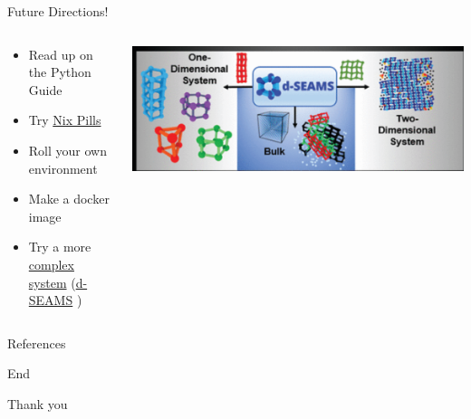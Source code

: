\documentclass[bigger,unknownkeysallowed,aspectratio=169,colorblocks]{beamer}
\begin{document}
\begin{frame}[label={sec:org35065dd}]{Future Directions!}
\begin{columns}
\begin{column}{0.6\columnwidth}
\begin{itemize}
\item Read up on the Python Guide
\item Try \href{https://nixos.org/nixos/nix-pills/why-you-should-give-it-a-try.html}{Nix Pills}
\item Roll your own environment
\item Make a docker image
\item Try a more \href{https://github.com/d-SEAMS/seams-core/blob/691da72262db40625774a2aed05d23c17a211360/nix/pkgs/sharkML/sharkML.nix}{complex system} (\href{https://dseams.info}{d-SEAMS} \cite{goswamiDSEAMSDeferredStructural2020})
\end{itemize}
\end{column}
\begin{column}{0.4\columnwidth}
\begin{center}
\includegraphics[width=.9\linewidth]{images/A_screenshot/2020-05-22_23-54-29_screenshot.png}
\end{center}
\end{column}
\end{columns}
\end{frame}

\begin{frame}[allowframebreaks]{References}
\printbibliography
\end{frame}

\begin{frame}[label={sec:org5b016d4},standout]{End}
\begin{center}
\Huge Thank you
\end{center}
\end{frame}
\end{document}
